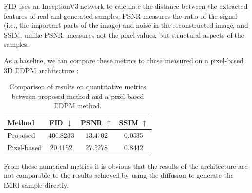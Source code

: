 	
	FID uses an InceptionV3 \cite{szegedy2016rethinking} network to calculate the distance between the extracted features of real and generated samples, PSNR measures the ratio of the signal (i.e., the important parts of the image) and noise in the reconstructed image, and SSIM, unlike PSNR, measures not the pixel values, but structural aspects of the samples.
	
	As a baseline, we can compare these metrics to those measured on a pixel-based 3D DDPM architecture \cite{diff_pixel}:
	
	\begin{table}[!h]
		\begin{center}
			\begin{tabular}{lccc}
				\toprule
				Method & FID $\downarrow$ & PSNR $\uparrow$ & SSIM $\uparrow$ \\
				\midrule
				Proposed & 400.8233 & 13.4702 & 0.0535 \\
				Pixel-based & 20.4152 & 27.5278 & 0.8442\\
				\bottomrule
			\end{tabular}
		\end{center}
		\caption{Comparison of results on quantitative metrics between proposed method and a pixel-based DDPM method.}
	\end{table}
	
	From these numerical metrics it is obvious that the results of the architecture are not comparable to the results achieved by using the diffusion to generate the fMRI sample directly. 
	
